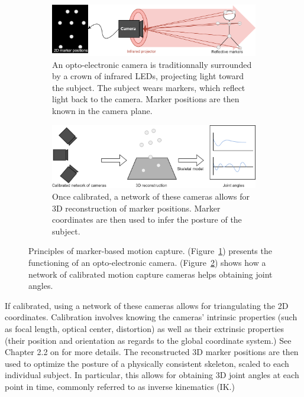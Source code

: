 \begin{figure}[hbtp]
	\centering
	\begin{subfigure}[b]{1\textwidth}
		\centering
		\def\svgwidth{\columnwidth}
		\fontsize{10pt}{10pt}\selectfont
		\includegraphics[width=\linewidth]{"../Chap1/Figures/Fig_Markers_1.png"}
		\caption{An opto-electronic camera is traditionnally surrounded by a crown of infrared LEDs, projecting light toward the subject. The subject wears markers, which reflect light back to the camera. Marker positions are then known in the camera plane.}
		\label{fig_mk1}
	\end{subfigure}
	\qquad
	\begin{subfigure}[b]{1\textwidth}
		\centering
		\def\svgwidth{\columnwidth}
		\fontsize{10pt}{10pt}\selectfont
		\includegraphics[width=\linewidth]{"../Chap1/Figures/Fig_Markers_2.png"}
		\caption{Once calibrated, a network of these cameras allows for 3D reconstruction of marker positions. Marker coordinates are then used to infer the posture of the subject.}
		\label{fig_mk2}
	\end{subfigure}
	\caption{Principles of marker-based motion capture. (Figure~\ref{fig_mk1}) presents the functioning of an opto-electronic camera. (Figure~\ref{fig_mk2}) shows how a network of calibrated motion capture cameras helps obtaining joint angles.}
	\label{fig_mk}
\end{figure}

\clearpage
If calibrated, using a network of these cameras allows for triangulating the 2D coordinates. Calibration involves knowing the cameras' intrinsic properties (such as focal length, optical center, distortion) as well as their extrinsic properties (their position and orientation as regards to the global coordinate system.) See Chapter 2.2 on  for more details. The reconstructed 3D marker positions are then used to optimize the posture of a physically consistent skeleton, scaled to each individual subject. In particular, this allows for obtaining 3D joint angles at each point in time, commonly referred to as inverse kinematics (IK.)

